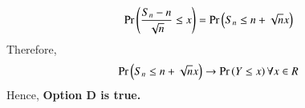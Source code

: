 \documentclass[journal,12pt,twocolumn]{IEEEtran}
\begin{document}
\begin{enumerate}[(A)]
\begin{align}
     \Pr{\ensuremath{\left(\frac{S_{n}-n}{\sqrt{n}} \leq x\right)}}= \Pr{\ensuremath{\left(S_{n} \leq n+\sqrt{n}x\right)}}
\end{align}
Therefore,
\begin{align}
   \Pr\left(S_n \leq n+ \sqrt{n}x\right) \rightarrow \Pr\left(Y \leq x\right) \forall x \in R \label{new}
\end{align}
Hence, \textbf{Option D is true.}
 
 \end{enumerate}
    
\end{document}
